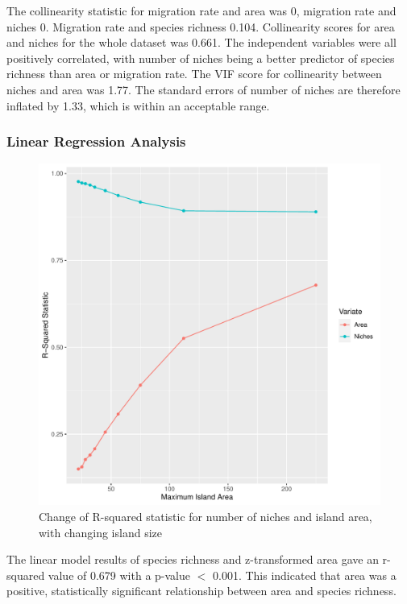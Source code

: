 \documentclass{article}
\begin{document}
The collinearity statistic for migration rate and area was 0, migration rate and niches 0. Migration rate and species richness 0.104. Collinearity scores for area and niches for the whole dataset was 0.661. The independent variables were all positively correlated, with number of niches being a better predictor of species richness than area or migration rate. The VIF score for collinearity between niches and area was 1.77. The standard errors of number of niches are therefore inflated by 1.33, which is within an acceptable range. 

\subsubsection{Linear Regression Analysis}

\begin{figure}[h!]
\centering
  \includegraphics[scale=0.5]{../../Results/Simulation/LMRSquared.pdf}
  \caption{Change of R-squared statistic for number of niches and island area, with changing island size}
  \label{fig:R-Squared statistic}
\end{figure}

The linear model results of species richness and z-transformed area gave an r-squared value of 0.679 with a p-value $<$ 0.001. This indicated that area was a positive, statistically significant relationship between area and species richness. \bigskip
\end{document}
